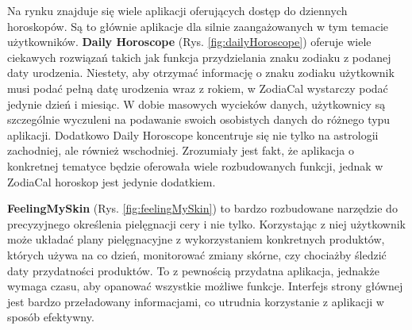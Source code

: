 Na rynku znajduje się wiele aplikacji oferujących dostęp do dziennych horoskopów. Są to głównie aplikacje dla silnie zaangażowanych w tym temacie użytkowników. \textbf{Daily Horoscope}
(Rys. \ref{fig:dailyHoroscope}) oferuje wiele ciekawych rozwiązań takich jak funkcja przydzielania znaku zodiaku
z podanej daty urodzenia. Niestety, aby otrzymać informację o znaku zodiaku użytkownik musi
podać pełną datę urodzenia wraz z rokiem, w ZodiaCal wystarczy podać jedynie dzień i miesiąc.
W dobie masowych wycieków danych, użytkownicy są szczególnie wyczuleni na podawanie
swoich osobistych danych do różnego typu aplikacji. Dodatkowo Daily Horoscope koncentruje
się nie tylko na astrologii zachodniej, ale również wschodniej. Zrozumiały jest fakt, że aplikacja
o konkretnej tematyce będzie oferowała wiele rozbudowanych funkcji, jednak w ZodiaCal
horoskop jest jedynie dodatkiem.


\textbf{FeelingMySkin} (Rys. \ref{fig:feelingMySkin}) to bardzo rozbudowane narzędzie do precyzyjnego określenia pielęgnacji cery i nie tylko.
Korzystając z niej użytkownik może układać plany pielęgnacyjne z wykorzystaniem konkretnych produktów,
których używa na co dzień, monitorować zmiany skórne, czy chociażby śledzić daty przydatności produktów.
To z pewnością przydatna aplikacja, jednakże wymaga czasu, aby opanować wszystkie możliwe funkcje.
Interfejs strony głównej jest bardzo przeładowany informacjami, co utrudnia korzystanie z aplikacji w sposób efektywny.

